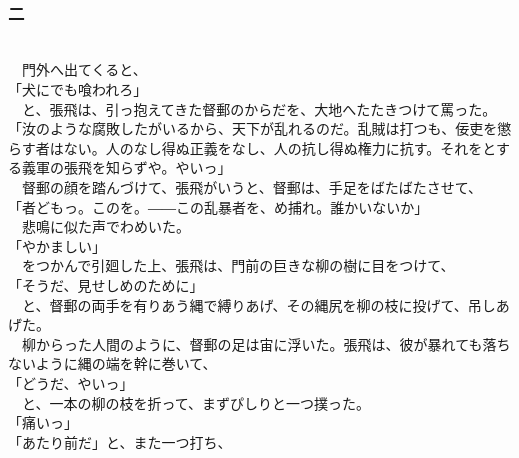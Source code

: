 \documentclass[
  paper=a5,
  fontsize=10pt,
  jafontsize=9.5pt,
  tate,                  %
  open_bracket_pos=nibu, %
]{jlreq}
\begin{document}
\\

\subsubsection{二}

\\


　門外へ出てくると、\\


「犬にでも喰われろ」\\


　と、張飛は、引っ抱えてきた督郵のからだを、大地へたたきつけて罵った。\\


「汝のような腐敗したがいるから、天下が乱れるのだ。乱賊は打つも、佞吏を懲らす者はない。人のなし得ぬ正義をなし、人の抗し得ぬ権力に抗す。それをとする義軍の張飛を知らずや。やいっ」\\


　督郵の顔を踏んづけて、張飛がいうと、督郵は、手足をばたばたさせて、\\


「者どもっ。このを。――この乱暴者を、め捕れ。誰かいないか」\\


　悲鳴に似た声でわめいた。\\


「やかましい」\\


　をつかんで引廻した上、張飛は、門前の巨きな柳の樹に目をつけて、\\


「そうだ、見せしめのために」\\


　と、督郵の両手を有りあう縄で縛りあげ、その縄尻を柳の枝に投げて、吊しあげた。\\


　柳からった人間のように、督郵の足は宙に浮いた。張飛は、彼が暴れても落ちないように縄の端を幹に巻いて、\\


「どうだ、やいっ」\\


　と、一本の柳の枝を折って、まずぴしりと一つ撲った。\\


「痛いっ」\\


「あたり前だ」と、また一つ打ち、\\
\end{document}
